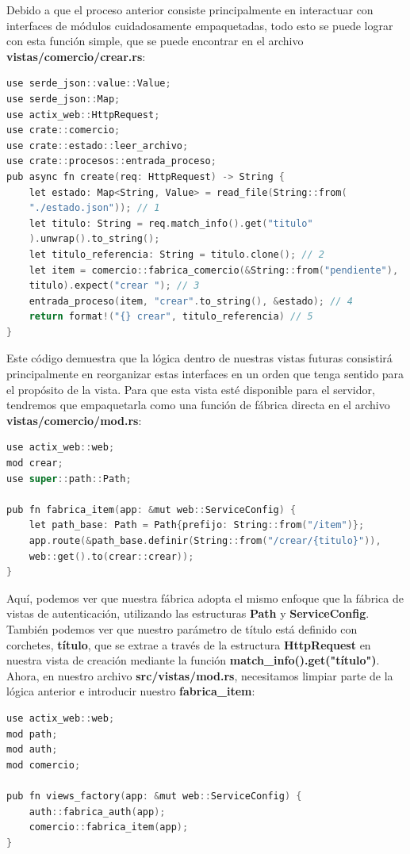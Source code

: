 Debido a que el proceso anterior consiste principalmente en interactuar con interfaces de módulos cuidadosamente empaquetadas, todo esto se puede lograr con esta función simple, que se puede encontrar en el archivo \textbf{vistas/comercio/crear.rs}:

\begin{lstlisting}[language=C]
use serde_json::value::Value;
use serde_json::Map;
use actix_web::HttpRequest;
use crate::comercio;
use crate::estado::leer_archivo;
use crate::procesos::entrada_proceso;
pub async fn create(req: HttpRequest) -> String {
	let estado: Map<String, Value> = read_file(String::from(
	"./estado.json")); // 1
	let titulo: String = req.match_info().get("titulo"
	).unwrap().to_string();
	let titulo_referencia: String = titulo.clone(); // 2
	let item = comercio::fabrica_comercio(&String::from("pendiente"),
	titulo).expect("crear "); // 3
	entrada_proceso(item, "crear".to_string(), &estado); // 4    
	return format!("{} crear", titulo_referencia) // 5
}
\end{lstlisting}

Este código demuestra que la lógica dentro de nuestras vistas futuras consistirá principalmente en reorganizar estas interfaces en un orden que tenga sentido para el propósito de la vista. Para que esta vista esté disponible para el servidor, tendremos que empaquetarla como una función de fábrica directa en el archivo \textbf{vistas/comercio/mod.rs}:

\begin{lstlisting}[language=C]
use actix_web::web;
mod crear;
use super::path::Path;

pub fn fabrica_item(app: &mut web::ServiceConfig) {
	let path_base: Path = Path{prefijo: String::from("/item")};
	app.route(&path_base.definir(String::from("/crear/{titulo}")),
	web::get().to(crear::crear));
}
\end{lstlisting}

Aquí, podemos ver que nuestra fábrica adopta el mismo enfoque que la fábrica de vistas de autenticación, utilizando las estructuras \textbf{Path} y \textbf{ServiceConfig}. También podemos ver que nuestro parámetro de título está definido con corchetes, \textbf{{título}}, que se extrae a través de la estructura \textbf{HttpRequest} en nuestra vista de creación mediante la función \textbf{match\_info().get("título")}. Ahora, en nuestro archivo \textbf{src/vistas/mod.rs}, necesitamos limpiar parte de la lógica anterior e introducir nuestro \textbf{fabrica\_item}:


\begin{lstlisting}[language=C]
use actix_web::web;
mod path;
mod auth;
mod comercio;

pub fn views_factory(app: &mut web::ServiceConfig) {
	auth::fabrica_auth(app);
	comercio::fabrica_item(app);
}
\end{lstlisting}

